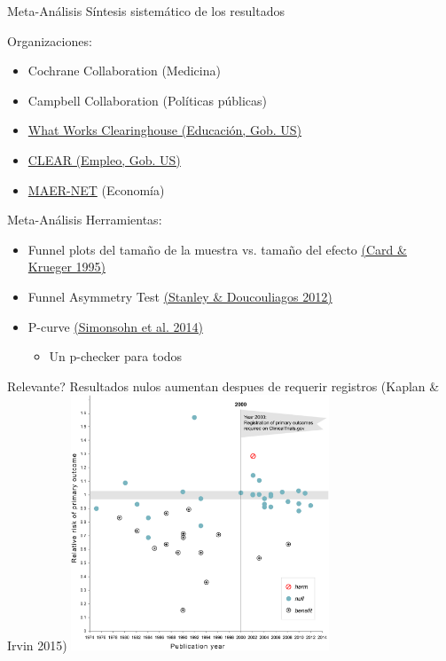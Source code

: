 \documentclass{beamer}
\begin{document}
\begin{frame}{Meta-Análisis}
Síntesis sistemático de los resultados

\vspace{.2in}
Organizaciones:
\begin{itemize}[<.->]
\item Cochrane Collaboration (Medicina)
\item Campbell Collaboration (Políticas públicas)
\item \href{http://ies.ed.gov/ncee/wwc/}{What Works Clearinghouse (Educación, Gob. US)}
\item \href{http://clear.dol.gov/}{CLEAR (Empleo, Gob. US)}
\item \href{https://www.hendrix.edu/maer-network/}{MAER-NET} (Economía)
\end{itemize}
\end{frame}

\begin{frame}{Meta-Análisis}
Herramientas:
\begin{itemize}[<.->]
\item Funnel plots del tamaño de la muestra vs. tamaño del efecto  \href{http://www.jstor.org/stable/2117925}{(Card \& Krueger 1995)}
\item Funnel Asymmetry Test \href{https://books.google.com/books?id=jSQEdEsL7VoC}{(Stanley \& Doucouliagos 2012)}
\item P-curve \href{http://p-curve.com/}{(Simonsohn et al. 2014)} \href{http://p-curve.com/}{}
\begin{itemize}
	\item Un p-checker para todos \href{http://shinyapps.org/apps/p-checker/}{}	
\end{itemize}
\end{itemize}
\end{frame}


\begin{frame}{Relevante? Resultados nulos aumentan despues de requerir registros (Kaplan \& Irvin 2015)}
\includegraphics[height = 3in]{../Images/plosone.PNG}

\end{frame}
\end{document}
